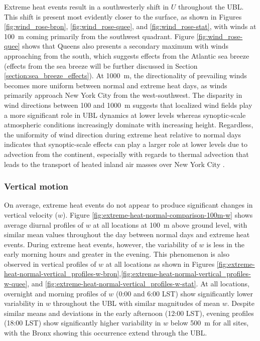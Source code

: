 \documentclass[num-refs]{wiley-article}
\begin{document}
Extreme heat events result in a southwesterly shift in $U$ throughout the UBL. This shift is present most evidently closer to the surface, as shown in Figures \ref{fig:wind_rose-bron}, \ref{fig:wind_rose-quee}, and \ref{fig:wind_rose-stat}, with winds at \SI{100}{\meter} coming primarily from the southwest quadrant. Figure \ref{fig:wind_rose-quee} shows that Queens also presents a secondary maximum with winds approaching from the south, which suggests effects from the Atlantic sea breeze (effects from the sea breeze will be further discussed in Section \ref{section:sea_breeze_effects}). At \SI{1000}{\meter}, the directionality of prevailing winds becomes more uniform between normal and extreme heat days, as winds primarily approach New York City from the west-southwest. The disparity in wind directions between 100 and \SI{1000}{\meter} suggests that localized wind fields play a more significant role in UBL dynamics at lower levels whereas synoptic-scale atmospheric conditions increasingly dominate with increasing height. Regardless, the uniformity of wind direction during extreme heat relative to normal days indicates that synoptic-scale effects can play a larger role at lower levels due to advection from the continent, especially with regards to thermal advection that leads to the transport of heated inland air masses over New York City \citep{ramamurthy2017b}.

\subsubsection{Vertical motion}
On average, extreme heat events do not appear to produce significant changes in vertical velocity ($w$). Figure \ref{fig:extreme-heat-normal-comparison-100m-w} shows average diurnal profiles of $w$ at all locations at \SI{100}{\meter} above ground level, with similar mean values throughout the day between normal days and extreme heat events. During extreme heat events, however, the variability of $w$ is less in the early morning hours and greater in the evening. This phenomenon is also observed in vertical profiles of $w$ at all locations as shown in Figures \ref{fig:extreme-heat-normal-vertical_profiles-w-bron},\ref{fig:extreme-heat-normal-vertical_profiles-w-quee}, and \ref{fig:extreme-heat-normal-vertical_profiles-w-stat}. At all locations, overnight and morning profiles of $w$ (0:00 and 6:00 LST) show significantly lower variability in $w$ throughout the UBL with similar magnitudes of mean $w$. Despite similar means and deviations in the early afternoon (12:00 LST), evening profiles (18:00 LST) show significantly higher variability in $w$ below \SI{500}{\meter} for all sites, with the Bronx showing this occurrence extend through the UBL.
\end{document}
